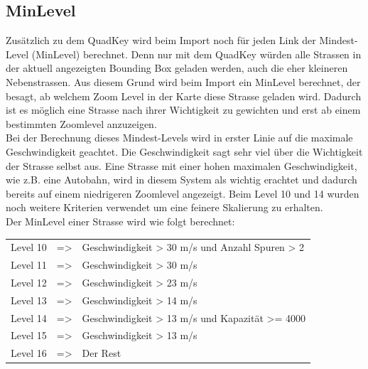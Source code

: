 \subsection{MinLevel}
Zusätzlich zu dem QuadKey wird beim Import noch für jeden Link der Mindest-Level (MinLevel) berechnet. Denn nur mit dem QuadKey würden alle Strassen in der aktuell angezeigten Bounding Box geladen werden, auch die eher kleineren Nebenstrassen. Aus diesem Grund wird beim Import ein MinLevel berechnet, der besagt, ab welchem Zoom Level in der Karte diese Strasse geladen wird. Dadurch ist es möglich eine Strasse nach ihrer Wichtigkeit zu gewichten und erst ab einem bestimmten Zoomlevel anzuzeigen. \\
Bei der Berechnung dieses Mindest-Levels wird in erster Linie auf die maximale  Geschwindigkeit geachtet. Die Geschwindigkeit sagt sehr viel über die Wichtigkeit der Strasse selbst aus. Eine Strasse mit einer hohen maximalen Geschwindigkeit, wie z.B. eine Autobahn, wird in diesem System als wichtig erachtet und dadurch bereits auf einem niedrigeren Zoomlevel angezeigt. Beim Level 10 und 14 wurden noch weitere Kriterien verwendet um eine feinere Skalierung zu erhalten.\\
Der MinLevel einer Strasse wird wie folgt berechnet:\\[0.3cm]
\begin{tabular}{l c l} 
Level 10 & => & Geschwindigkeit > 30 m/s und Anzahl Spuren > 2 \\ 
Level 11 & => & Geschwindigkeit > 30 m/s  \\ 
Level 12 & => & Geschwindigkeit > 23 m/s \\ 
Level 13 & => & Geschwindigkeit > 14 m/s \\ 
Level 14 & => & Geschwindigkeit > 13 m/s und Kapazität >= 4000  \\ 
Level 15 & => & Geschwindigkeit > 13 m/s \\ 
Level 16 & => & Der Rest \\ 
\end{tabular} 

